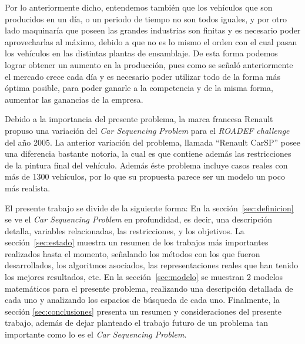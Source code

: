 Por lo anteriormente dicho, entendemos también que los vehículos que son producidos en un día,
o un periodo de tiempo no son todos iguales, y por otro lado maquinaría que poseen las grandes industrias son
finitas y es necesario poder aprovecharlas al máximo, debido a que no es lo mismo el orden con el cual pasan
los vehículos en las distintas plantas de ensamblaje.
De esta forma podemos lograr obtener un aumento en la producción, pues como
se señaló anteriormente el mercado crece cada día y es necesario poder utilizar todo de la forma
más óptima posible, para poder ganarle a la competencia y de la misma forma, aumentar las ganancias
de la empresa.

Debido a la importancia del presente problema, la marca francesa Renault propuso una variación del \emph{Car Sequencing Problem}
para el \emph{ROADEF challenge} del año 2005. La anterior variación del problema, llamada ``Renault CarSP'' posee una
diferencia bastante notoria, la cual es que contiene además las restricciones de la pintura final del vehículo.
Además éste problema incluye casos reales con más de 1300 vehículos, por lo que su propuesta parece ser un modelo un poco
más realista.

El presente trabajo se divide de la siguiente forma:
En la sección~\ref{sec:definicion}
se ve el \emph{Car Sequencing Problem} en profundidad, es decir, una descripción detalla, variables
relacionadas, las restricciones, y los objetivos.
La sección~\ref{sec:estado} muestra un resumen de los trabajos más importantes realizados hasta el momento,
señalando los métodos con los que fueron desarrollados, los algoritmos asociados, las representaciones
reales que han tenido los mejores resultados, etc.
En la sección~\ref{sec:modelo}
se muestran 2 modelos matemáticos para el presente problema, realizando una descripción detallada
de cada uno y analizando los espacios de búsqueda de cada uno.
Finalmente,
la sección \ref{sec:conclusiones} presenta un resumen
y consideraciones del presente trabajo,
además de dejar planteado el trabajo futuro de un problema tan importante como lo es el \emph{Car
Sequencing Problem}.

